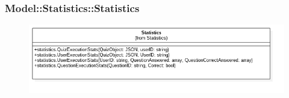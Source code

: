 \subsubsection{Model::Statistics::Statistics}
\begin{figure}[h!]
\begin{center}
	\includegraphics[scale=0.6]{../images/Model/Statistics/Statistics.png}
\end{center}
\end{figure}
